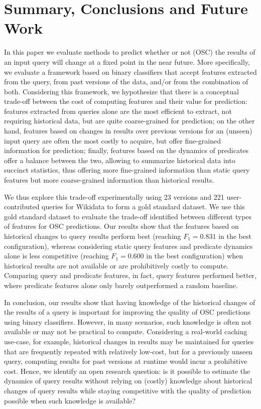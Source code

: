 \documentclass[runningheads]{llncs}
\begin{document}
\section{Summary, Conclusions and Future Work}
\label{sec:conclusion}

In this paper we evaluate methods to predict whether or not (OSC) the results of an input query will change at a fixed point in the near future. More specifically, we evaluate a framework based on binary classifiers that accept features extracted from the query, from past versions of the data, and/or from the combination of both. Considering this framework, we hypothesize that there is a conceptual trade-off between the cost of computing features and their value for prediction: features extracted from queries alone are the most efficient to extract, not requiring historical data, but are quite coarse-grained for prediction; on the other hand, features based on changes in results over previous versions for an (unseen) input query are often the most costly to acquire, but offer fine-grained information for prediction; finally, features based on the dynamics of predicates offer a balance between the two, allowing to summarize historical data into succinct statistics, thus offering more fine-grained information than static query features but more coarse-grained information than historical results.

We thus explore this trade-off experimentally using 23 versions and 221 user-contributed queries for Wikidata to form a gold standard dataset. We use this gold standard dataset to evaluate the trade-off identified between different types of features for OSC predictions. Our results show that the features based on historical changes to query results perform best (reaching $F_1 = 0.831$ in the best configuration), whereas considering static query features and predicate dynamics alone is less competitive (reaching $F_1 =0.600$ in the best configuration) when historical results are not available or are prohibitively costly to compute. Comparing query and predicate features, in fact, query features performed better, where predicate features alone only barely outperformed a random baseline.

In conclusion, our results show that having knowledge of the historical changes of the results of a query is important for improving the quality of OSC predictions using binary classifiers. However, in many scenarios, such knowledge is often not available or may not be practical to compute. Considering a real-world caching use-case, for example, historical changes in results may be maintained for queries that are frequently repeated with relatively low-cost, but for a previously unseen query, computing results for past versions at runtime would incur a prohibitive cost. Hence, we identify an open research question: is it possible to estimate the dynamics of query results without relying on (costly) knowledge about historical changes of query results while staying competitive with the quality of prediction possible when such knowledge is available? 
\end{document}

